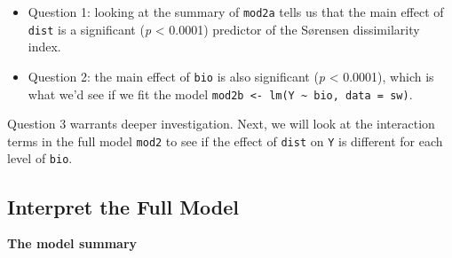\documentclass[
  letterpaper,
]{book}
\providecommand{\tightlist}{%
  \setlength{\itemsep}{0pt}\setlength{\parskip}{0pt}}\usepackage{longtable,booktabs,array}
\begin{document}
\begin{itemize}
\tightlist
\item
  Question 1: looking at the summary of \texttt{mod2a} tells us that the
  main effect of \texttt{dist} is a significant (\emph{p} \textless{}
  0.0001) predictor of the Sørensen dissimilarity index.
\item
  Question 2: the main effect of \texttt{bio} is also significant
  (\emph{p} \textless{} 0.0001), which is what we'd see if we fit the
  model
  \texttt{mod2b\ \textless{}-\ lm(Y\ \textasciitilde{}\ bio,\ data\ =\ sw)}.
\end{itemize}

Question 3 warrants deeper investigation. Next, we will look at the
interaction terms in the full model \texttt{mod2} to see if the effect
of \texttt{dist} on \texttt{Y} is different for each level of
\texttt{bio}.

\subsection{Interpret the Full Model}\label{interpret-the-full-model}

\textbf{The model summary}
\end{document}
